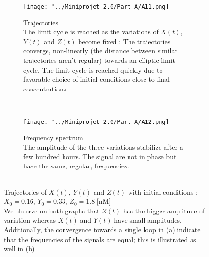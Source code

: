 \documentclass[10pt,a4paper,oneside,twocolumn]{article}
\numberwithin{equation}{section} %
\begin{document}
    \begin{figure}[!h]
	\begin{subfigure}[b]{0.5\textwidth}
	    \texttt{[image: "../Miniprojet 2.0/Part A/A11.png]}
	    \caption{Trajectories\\
	    The limit cycle is reached as the variations of $X(t)$, $Y(t)$ and $Z(t)$ become fixed : The trajectories converge, non-linearly (the distance between similar trajectories aren't regular) towards an elliptic limit cycle. The limit cycle is reached quickly due to favorable choice of initial conditions close to final concentrations. }
	\end{subfigure}
	~
	\begin{subfigure}[b]{0.5\textwidth}
	    \texttt{[image: "../Miniprojet 2.0/Part A/A12.png]}
	    \caption{Frequency spectrum \\
	    The amplitude of the three variations stabilize after a few hundred hours. The signal are not in phase but have the same, regular, frequencies.}
	\end{subfigure}
	\caption{\\Trajectories of $X(t)$, $Y(t)$ and $Z(t)$ with initial conditions : $X_0 = 0.16$, $Y_0 = 0.33 $, $Z_0 = 1.8$ [nM]\\ We observe on both graphs that $Z(t)$ has the bigger amplitude of variation whereas $X(t)$ and $Y(t)$ have small amplitudes. Additionally, the convergence towards a single loop in (a) indicate that the frequencies of the signals are equal; this is illustrated as well in (b)
	}
    \end{figure}
\end{document}
